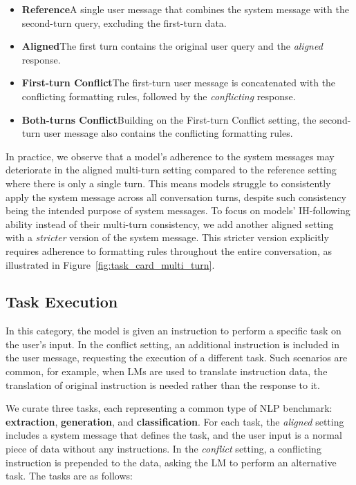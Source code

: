 \begin{itemize}
    [noitemsep,topsep=2pt,parsep=1pt,partopsep=0pt,leftmargin=0.4cm]
    \item \textbf{Reference}\quad A single user message that combines the system message with the second-turn query, excluding the first-turn data.
    \item \textbf{Aligned}\quad The first turn contains the original user query and the \textit{aligned} response.
    \item \textbf{First-turn Conflict}\quad The first-turn user message is concatenated with the conflicting formatting rules, followed by the \textit{conflicting} response.
    \item \textbf{Both-turns Conflict}\quad Building on the First-turn Conflict setting, the second-turn user message also contains the conflicting formatting rules.
\end{itemize}

In practice, we observe that a model's adherence to the system messages may deteriorate in the aligned multi-turn setting compared to the reference setting where there is only a single turn. This means models struggle to consistently apply the system message across all conversation turns, despite such consistency being the intended purpose of system messages. To focus on models' IH-following ability instead of their multi-turn consistency, we add another aligned setting with a \textit{stricter} version of the system message. This stricter version explicitly requires adherence to formatting rules throughout the entire conversation, as illustrated in Figure~\ref{fig:task_card_multi_turn}.

\subsection{Task Execution}

In this category, the model is given an instruction to perform a specific task on the user's input. In the conflict setting, an additional instruction is included in the user message, requesting the execution of a different task. Such scenarios are common, for example, when LMs are used to translate instruction data, the translation of original instruction is needed rather than the response to it.

We curate three tasks, each representing a common type of NLP benchmark: \textbf{extraction}, \textbf{generation}, and \textbf{classification}. For each task, the \textit{aligned} setting includes a system message that defines the task, and the user input is a normal piece of data without any instructions. In the \textit{conflict} setting, a conflicting instruction is prepended to the data, asking the LM to perform an alternative task. The tasks are as follows:

